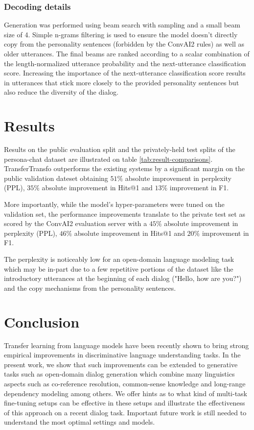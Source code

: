 \documentclass[letterpaper]{article} \usepackage{aaai19}  \usepackage{times}  \usepackage{helvet}  \usepackage{courier}  \usepackage{url}  \usepackage{graphicx}  \usepackage{natbib}
\begin{document}
\subsubsection{Decoding details}

Generation was performed using beam search with sampling and a small beam size of 4. Simple n-grams filtering is used to ensure the model doesn't directly copy from the personality sentences (forbidden by the ConvAI2 rules) as well as older utterances. The final beams are ranked according to a scalar combination of the length-normalized utterance probability and the next-utterance classification score. Increasing the importance of the next-utterance classification score results in utterances that stick more closely to the provided personality sentences but also reduce the diversity of the dialog.

\section{Results}

Results on the public evaluation split and the privately-held test splits of the {\sc persona-chat} dataset are illustrated on table \ref{tab:result-comparisons}. TransferTransfo outperforms the existing systems by a significant margin on the public validation dateset obtaining $51\%$ absolute improvement in perplexity (PPL), $35\%$ absolute improvement in Hits@1 and $13\%$ improvement in F1.

More importantly, while the model's hyper-parameters were tuned on the validation set, the performance improvements translate to the private test set as scored by the ConvAI2 evaluation server with a $45\%$ absolute improvement in perplexity (PPL), $46\%$ absolute improvement in Hits@1 and $20\%$ improvement in F1.

The perplexity is noticeably low for an open-domain language modeling task which may be in-part due to a few repetitive portions of the dataset like the introductory utterances at the beginning of each dialog ("Hello, how are you?") and the copy mechanisms from the personality sentences.

\section{Conclusion}

Transfer learning from language models have been recently shown to bring strong empirical improvements in discriminative language understanding tasks. In the present work, we show that such improvements can be extended to generative tasks such as open-domain dialog generation which combine many linguistics aspects such as co-reference resolution, common-sense knowledge and long-range dependency modeling among others. We offer hints as to what kind of multi-task fine-tuning setups can be effective in these setups and illustrate the effectiveness of this approach on a recent dialog task. Important future work is still needed to understand the most optimal settings and models.



\end{document}

